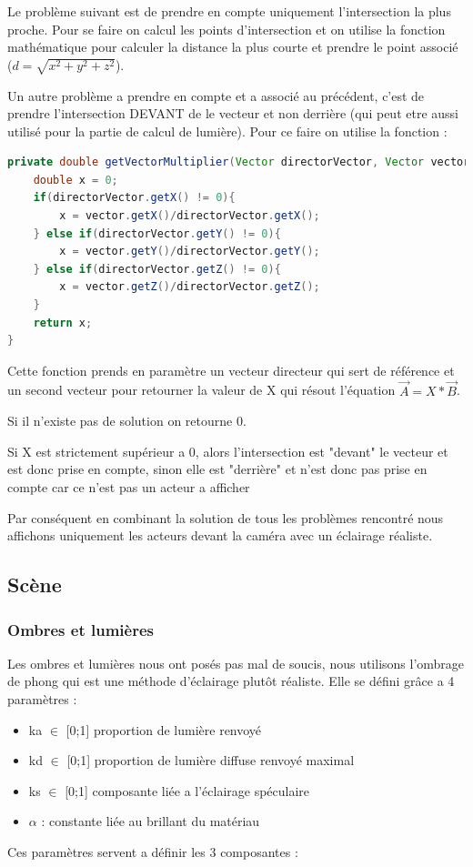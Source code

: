 \documentclass[12pt]{article}
\begin{document}
			Le problème suivant est de prendre en compte uniquement l'intersection la plus proche. Pour se faire on calcul les points d'intersection et on utilise la fonction mathématique pour calculer la distance la plus courte et prendre le point associé ($d = \sqrt{x^2 + y^2 + z^2}$).
			
			Un autre problème a prendre en compte et a associé au précédent, c'est de prendre l'intersection DEVANT de le vecteur et non derrière (qui peut etre aussi utilisé pour la partie de calcul de lumière). Pour ce faire on utilise la fonction :
			
			\begin{lstlisting}[language=Java, title="Idée de factorisation"]
private double getVectorMultiplier(Vector directorVector, Vector vector){
	double x = 0;
	if(directorVector.getX() != 0){
		x = vector.getX()/directorVector.getX();
	} else if(directorVector.getY() != 0){
		x = vector.getY()/directorVector.getY();
	} else if(directorVector.getZ() != 0){
		x = vector.getZ()/directorVector.getZ();
	}
	return x;
}
			\end{lstlisting}
			
			Cette fonction prends en paramètre un vecteur directeur qui sert de référence et un second vecteur pour retourner la valeur de X qui résout l'équation $\vec{A} = X*\vec{B}$.
			
			Si il n'existe pas de solution on retourne 0.
			
			Si X est strictement supérieur a 0, alors l'intersection est "devant" le vecteur et est donc prise en compte, sinon elle est "derrière" et n'est donc pas prise en compte car ce n'est pas un acteur a afficher
			
			Par conséquent en combinant la solution de tous les problèmes rencontré nous affichons uniquement les acteurs devant la caméra avec un éclairage réaliste.		
			
		\subsection{Scène}
			\subsubsection{Ombres et lumières}
			Les ombres et lumières nous ont posés pas mal de soucis, nous utilisons l'ombrage de phong qui est une méthode d'éclairage plutôt réaliste. Elle se défini grâce a 4 paramètres :
			
			\begin{itemize}
				\item ka $\in$ [0;1] proportion de lumière renvoyé
				\item kd $\in$ [0;1] proportion de lumière diffuse renvoyé maximal
				\item ks $\in$ [0;1] composante liée a l'éclairage spéculaire
				\item $\alpha$ : constante liée au brillant du matériau
			\end{itemize}
			Ces paramètres servent a définir les 3 composantes :
			
\end{document}

